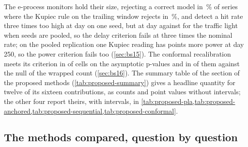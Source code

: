 The e-process monitors hold their size, rejecting a correct model in \pxFifteenENull{}\,\% of series where the Kupiec rule on the trailing window rejects in \pxFifteenKupTrail{}\,\%, and detect a hit rate three times too high at day \pxFifteenXThreeDay{} on one seed, but at day \pxFifteenPoolThreeMed{} against \pxFifteenPoolLight{} for the traffic light when \pxFifteenPoolSeeds{} seeds are pooled, so the delay criterion fails at three times the nominal rate; on the pooled replication one Kupiec reading has \pxFifteenPoolCostThree{} points more power at day 250, so the power criterion fails too (\cref{sec:bs15}). The conformal recalibration meets its criterion in \pxSixteenCellsHold{} of \pxSixteenCells{} cells on the asymptotic p-values and in \pxPpSixteenHoneGain{} of them against the null of the wrapped count (\cref{sec:bs16}). The summary table of the section of the proposed methods (\cref{tab:proposed-summary}) gives a headline quantity for twelve of its sixteen contributions, as counts and point values without intervals; the other four report theirs, with intervals, in \cref{tab:proposed-pla,tab:proposed-anchored,tab:proposed-sequential,tab:proposed-conformal}.

\subsection{The methods compared, question by question}
\label{sec:results-methods-compared}



